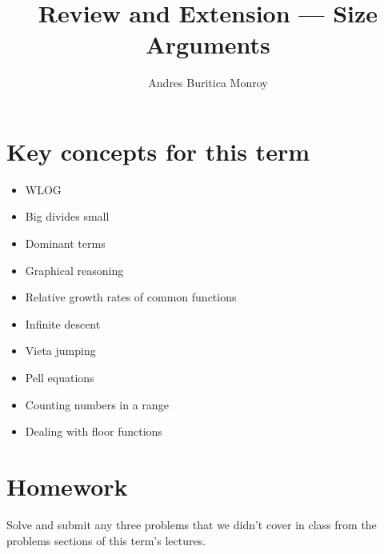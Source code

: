 \documentclass{article}
\title{Review and Extension --- Size Arguments}
\author{Andres Buritica Monroy}
\date{}
\begin{document}
\maketitle
\section{Key concepts for this term}
  \begin{itemize}
    \item WLOG
    \item Big divides small
    \item Dominant terms
    \item Graphical reasoning
    \item Relative growth rates of common functions
    \item Infinite descent
    \item Vieta jumping
    \item Pell equations
    \item Counting numbers in a range
    \item Dealing with floor functions
  \end{itemize}
\section{Homework}
Solve and submit any three problems that we didn't cover in class
from the problems sections of this term's lectures.
\newpage
\end{document}
